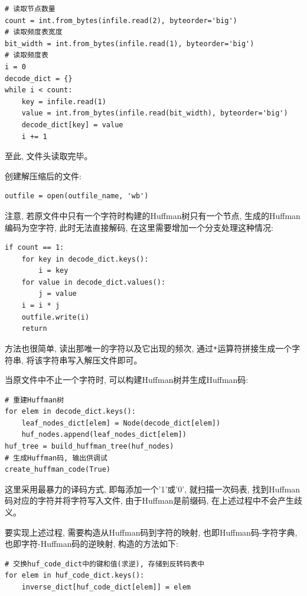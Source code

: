 \documentclass{ctexart}
\begin{document}
{\setmainfont{Courier New Bold}              
\begin{lstlisting}
# 读取节点数量
count = int.from_bytes(infile.read(2), byteorder='big')
# 读取频度表宽度
bit_width = int.from_bytes(infile.read(1), byteorder='big')
# 读取频度表
i = 0
decode_dict = {}
while i < count:
    key = infile.read(1)
    value = int.from_bytes(infile.read(bit_width), byteorder='big')
    decode_dict[key] = value
    i += 1
\end{lstlisting}}

至此, 文件头读取完毕。

创建解压缩后的文件:

{\setmainfont{Courier New Bold}              
\begin{lstlisting}
outfile = open(outfile_name, 'wb')
\end{lstlisting}}

注意, 若原文件中只有一个字符时构建的Huffman树只有一个节点, 生成的Huffman编码为空字符, 此时无法直接解码, 在这里需要增加一个分支处理这种情况:

{\setmainfont{Courier New Bold}              
\begin{lstlisting}
if count == 1:
    for key in decode_dict.keys():
        i = key
    for value in decode_dict.values():
        j = value
    i = i * j
    outfile.write(i)
    return
\end{lstlisting}}

方法也很简单, 读出那唯一的字符以及它出现的频次, 通过\texttt{*}运算符拼接生成一个字符串, 将该字符串写入解压文件即可。

当原文件中不止一个字符时, 可以构建Huffman树并生成Huffman码:

{\setmainfont{Courier New Bold}              
\begin{lstlisting}
# 重建Huffman树
for elem in decode_dict.keys():
    leaf_nodes_dict[elem] = Node(decode_dict[elem])
    huf_nodes.append(leaf_nodes_dict[elem])
huf_tree = build_huffman_tree(huf_nodes)
# 生成Huffman码, 输出供调试
create_huffman_code(True)
\end{lstlisting}}

这里采用最暴力的译码方式, 即每添加一个'1'或'0', 就扫描一次码表, 找到Huffman码对应的字符并将字符写入文件, 由于Huffman是前缀码, 在上述过程中不会产生歧义。

要实现上述过程, 需要构造从Huffman码到字符的映射, 也即Huffman码-字符字典, 也即字符-Huffman码的逆映射, 构造的方法如下:

{\setmainfont{Courier New Bold}              
\begin{lstlisting}
# 交换huf_code_dict中的键和值(求逆), 存储到反转码表中
for elem in huf_code_dict.keys():
    inverse_dict[huf_code_dict[elem]] = elem
\end{lstlisting}}
\end{document}

